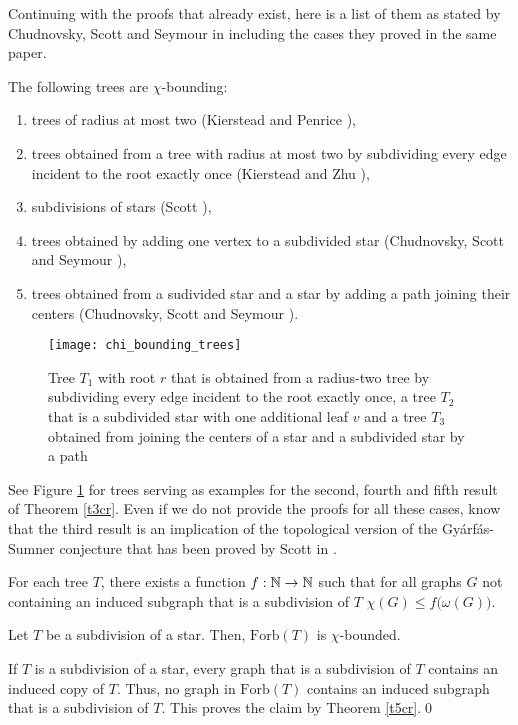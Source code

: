 Continuing with the proofs that already exist, here is a list of them as stated by Chudnovsky, Scott and Seymour in \cite{CSS17} including the cases they proved in the same paper.

\begin{thm}\label{t3cr}
The following trees are $\chi$-bounding:
\begin{enumerate}[(1)]
\item trees of radius at most two (Kierstead and Penrice \cite{Ki94}),
\item trees obtained from a tree with radius at most two by subdividing every edge incident to the root exactly once (Kierstead and Zhu \cite{Ki04}),
\item subdivisions of stars (Scott \cite{Sc97}),
\item trees obtained by adding one vertex to a subdivided star (Chudnovsky, Scott and Seymour \cite{CSS17}),
\item trees obtained from a sudivided star and a star by adding a path joining their centers (Chudnovsky, Scott and Seymour \cite{CSS17}).
\end{enumerate} 
\end{thm}

\begin{figure}[ht]
\begin{center}
\texttt{[image: chi\_bounding\_trees]}
\end{center}
\caption{Tree $T_1$ with root $r$ that is obtained from a radius-two tree by subdividing every edge incident to the root exactly once, a tree $T_2$ that is a subdivided star with one additional leaf $v$ and a tree $T_3$ obtained from joining the centers of a star and a subdivided star by a path}
\label{f2cr}
\end{figure}

See Figure \ref{f2cr} for trees serving as examples for the second, fourth and fifth result of Theorem \ref{t3cr}. Even if we do not provide the proofs for all these cases, know that the third result is an implication of the topological version of the Gyárfás-Sumner conjecture that has been proved by Scott in \cite{Sc97}.

\begin{thm}\label{t5cr}
For each tree $T$, there exists a function $f:\mathbb{N}\to\mathbb{N}$ such that for all graphs $G$ not containing an induced subgraph that is a subdivision of $T$ $\chi (G)\leq f\big(\omega (G)\big)$.
\end{thm}

\newpage
\begin{cor}
Let $T$ be a subdivision of a star. Then, $\text{Forb}(T)$ is $\chi$-bounded.
\end{cor}
\begin{prf}
If $T$ is a subdivision of a star, every graph that is a subdivision of $T$ contains an induced copy of $T$. Thus, no graph in $\text{Forb}(T)$ contains an induced subgraph that is a subdivision of $T$. This proves the claim by Theorem \ref{t5cr}.\qed
\end{prf}


